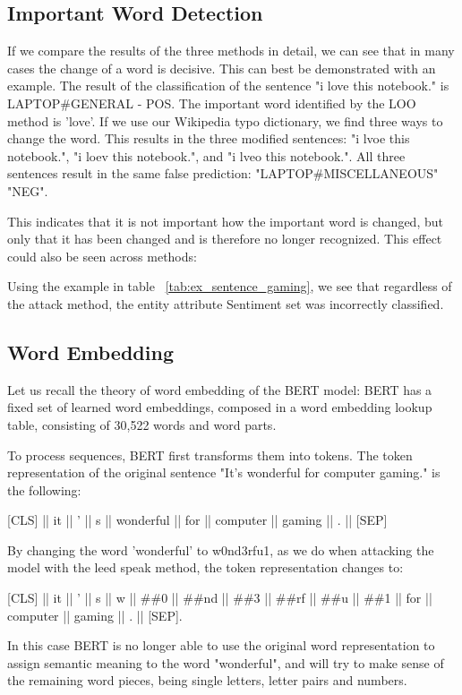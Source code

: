 \subsection{Important Word Detection}

If we compare the results of the three methods in detail, we can see that in many cases the change of a word is decisive. 
This can best be demonstrated with an example. 
The result of the classification of the sentence "i love this notebook." is LAPTOP#GENERAL - POS. The important word identified by the LOO method is 'love'. If we use our Wikipedia typo dictionary, we find three ways to change the word. This results in the three modified sentences: "i lvoe this notebook.", "i loev this notebook.", and "i lveo this notebook.".
All three sentences result in the same false prediction:
"LAPTOP#MISCELLANEOUS" "NEG".

This indicates that it is not important how the important word is changed, but only that it has been changed and is therefore no longer recognized.
This effect could also be seen across methods:

Using the example in table ~\ref{tab:ex_sentence_gaming}, we see that regardless of the attack method, the entity attribute Sentiment set was incorrectly classified. 


\subsection{Word Embedding}
Let us recall the theory of word embedding of the BERT model:
BERT has a fixed set of learned word embeddings, composed in a word embedding lookup table, consisting of 30,522 words and word parts. 

To process sequences, BERT first transforms them into tokens. The token representation of the original sentence "It’s wonderful for computer gaming." is the following:


{[}CLS{]}  ||  it  ||  '  ||  s  ||  wonderful  ||  for  ||  computer  ||  gaming  ||  .  ||  {[}SEP{]} 


By changing the word 'wonderful' to w0nd3rfu1, as we do when attacking the model with the leed speak method, the token representation changes to:

{[}CLS{]}  ||  it  ||  '  ||  s  ||  w  ||  \#\#0  ||  \#\#nd  ||  \#\#3  ||  \#\#rf  ||  \#\#u  ||  \#\#1  ||  for  ||  computer  ||  gaming  ||  .  ||  {[}SEP{]}.

In this case BERT is no longer able to use the original word representation to assign semantic meaning to the word "wonderful", and will try to make sense of the remaining word pieces, being single letters, letter pairs and numbers.

